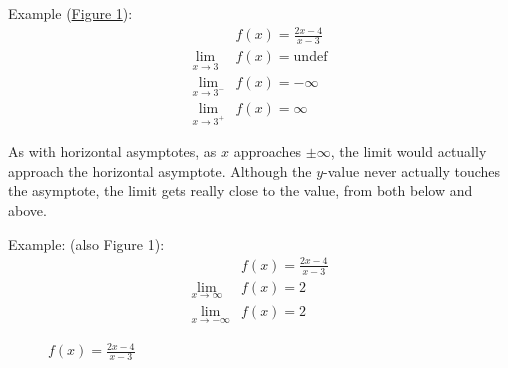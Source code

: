\documentclass[12pt]{article}
\begin{document}
            \noindent Example (\hyperref[fig:limasymptote]{Figure 1}):
            \begin{align*}
                &f(x) = \frac{2x-4}{x-3} \\
                \lim_{x \to 3} &f(x) = \text{undef} \\
                \lim_{x \to 3^-} &f(x) = -\infty \\
                \lim_{x \to 3^+} &f(x) = \infty
            \end{align*}

            As with horizontal asymptotes, as $x$ approaches $\pm \infty$, the limit would actually approach the horizontal asymptote. Although the $y$-value never actually touches the asymptote, the limit gets really close to the value, from both below and above.

            \noindent Example: (also Figure 1):
            \begin{align*}
                &f(x) = \frac{2x-4}{x-3} \\
                \lim_{x \to \infty} &f(x) = 2 \\
                \lim_{x \to -\infty} &f(x) = 2
            \end{align*}

            \begin{figure}[H]
                \begin{center}
                    \caption{$f(x) = \frac{2x-4}{x-3}$}
                    \label{fig:limasymptote}
                \end{center}
            \end{figure}
\end{document}
